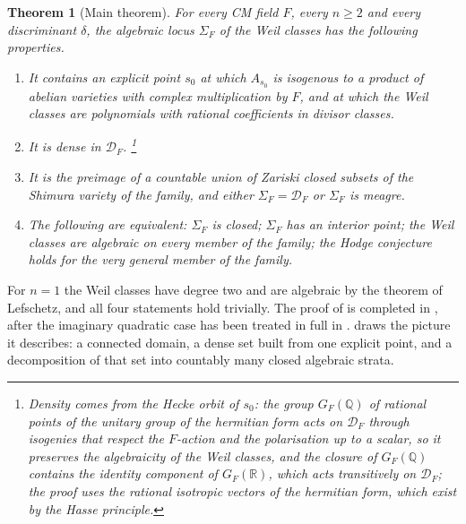 \documentclass[11pt,reqno]{amsart}
\theoremstyle{plain}
\newtheorem{theorem}{Theorem}[section]
\theoremstyle{definition}
\theoremstyle{remark}
\newcommand{\QQ}{\mathbb{Q}}
\newcommand{\RR}{\mathbb{R}}
\newcommand{\cD}{\mathcal{D}}
\begin{document}
\begin{theorem}[Main theorem]\label{thm:main}
For every CM field $F$, every $n\ge2$ and every discriminant $\delta$, the
algebraic locus $\Sigma_{F}$ of the Weil classes has the following
properties.
\begin{enumerate}[label=\textup{(\roman*)},leftmargin=2.6em,itemsep=2pt]
\item It contains an explicit point $s_{0}$ at which $A_{s_{0}}$ is isogenous
  to a product of abelian varieties with complex multiplication by $F$, and
  at which the Weil classes are polynomials with rational coefficients in
  divisor classes.
\item It is dense in $\cD_{F}$.%
\footnote{Density comes from the Hecke orbit of $s_{0}$: the group
$G_{F}(\QQ)$ of rational points of the unitary group of the hermitian form
acts on $\cD_{F}$ through isogenies that respect the $F$-action and the
polarisation up to a scalar, so it preserves the algebraicity of the Weil
classes, and the closure of $G_{F}(\QQ)$ contains the identity component of
$G_{F}(\RR)$, which acts transitively on $\cD_{F}$; the proof uses the
rational isotropic vectors of the hermitian form, which exist by the Hasse
principle.}
\item It is the preimage of a countable union of Zariski closed subsets of the
  Shimura variety of the family, and either $\Sigma_{F}=\cD_{F}$ or
  $\Sigma_{F}$ is meagre.
\item The following are equivalent: $\Sigma_{F}$ is closed; $\Sigma_{F}$ has
  an interior point; the Weil classes are algebraic on every member of the
  family; the Hodge conjecture holds for the very general member of the
  family.
\end{enumerate}
\end{theorem}

For $n=1$ the Weil classes have degree two and are algebraic by the theorem
of Lefschetz, and all four statements hold trivially. The proof of
 is completed in , after the imaginary
quadratic case has been treated in full in .
 draws the picture it describes: a connected domain, a
dense set built from one explicit point, and a decomposition of that set into
countably many closed algebraic strata.
\end{document}
